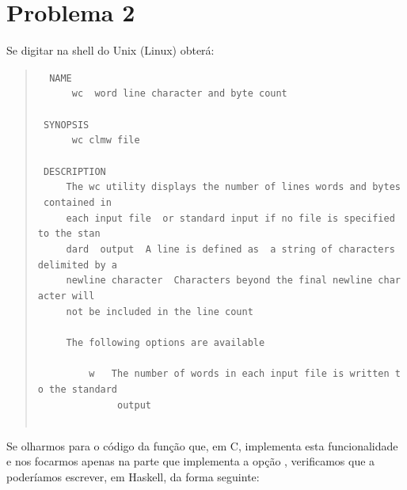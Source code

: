 \documentclass[a4paper]{article}
\newcommand{\Varid}[1]{\mathit{#1}}
\begin{document}
\section*{Problema 2}
Se digitar \wc{\ensuremath{\Varid{man}\;\Varid{wc}}} na shell do Unix (Linux) obterá:
\begin{quote}\small
\begin{tabbing}\tt
~NAME\\
\tt ~~~~~~wc~~word~line~character~and~byte~count\\
\tt ~\\
\tt ~SYNOPSIS\\
\tt ~~~~~~wc~clmw~file~\\
\tt ~\\
\tt ~DESCRIPTION\\
\tt ~~~~~The~wc~utility~displays~the~number~of~lines~words~and~bytes~contained~in\\
\tt ~~~~~each~input~file~~or~standard~input~if~no~file~is~specified~to~the~stan\\
\tt ~~~~~dard~~output~~A~line~is~defined~as~~a~string~of~characters~delimited~by~a\\
\tt ~~~~~newline~character~~Characters~beyond~the~final~newline~character~will\\
\tt ~~~~~not~be~included~in~the~line~count\\
\tt ~~~~~\\
\tt ~~~~~The~following~options~are~available\\
\tt ~~~~~\\
\tt ~~~~~~~~~w~~~The~number~of~words~in~each~input~file~is~written~to~the~standard\\
\tt ~~~~~~~~~~~~~~output\\
\tt ~~~~~
\end{tabbing}
\end{quote}
Se olharmos para o código da função que, em C, implementa esta funcionalidade
\cite{KR78} e nos focarmos apenas na parte que implementa a opção ,
verificamos que a poderíamos escrever, em Haskell, da forma seguinte:
\end{document}

